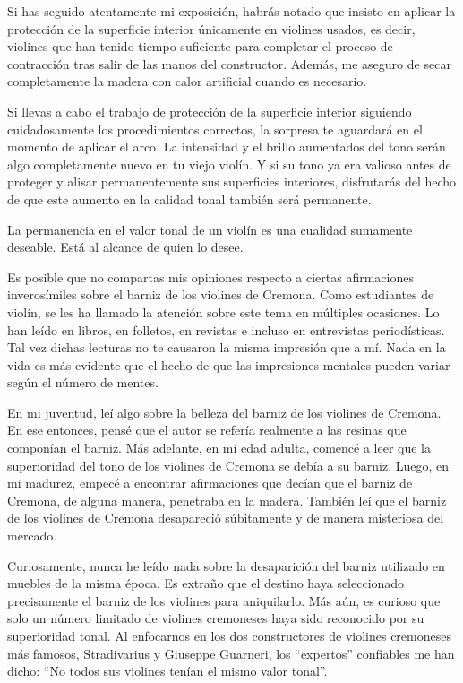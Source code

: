 \documentclass[12pt]{book}
\begin{document}
Si has seguido atentamente mi exposición, habrás notado que insisto en aplicar la protección de la superficie interior únicamente en violines usados, es decir, violines que han tenido tiempo suficiente para completar el proceso de contracción tras salir de las manos del constructor. Además, me aseguro de secar completamente la madera con calor artificial cuando es necesario.

Si llevas a cabo el trabajo de protección de la superficie interior siguiendo cuidadosamente los procedimientos correctos, la sorpresa te aguardará en el momento de aplicar el arco. La intensidad y el brillo aumentados del tono serán algo completamente nuevo en tu viejo violín. Y si su tono ya era valioso antes de proteger y alisar permanentemente sus superficies interiores, disfrutarás del hecho de que este aumento en la calidad tonal también será permanente.

La permanencia en el valor tonal de un violín es una cualidad sumamente deseable. Está al alcance de quien lo desee.

Es posible que no compartas mis opiniones respecto a ciertas afirmaciones inverosímiles sobre el barniz de los violines de Cremona. Como estudiantes de violín, se les ha llamado la atención sobre este tema en múltiples ocasiones. Lo han leído en libros, en folletos, en revistas e incluso en entrevistas periodísticas. Tal vez dichas lecturas no te causaron la misma impresión que a mí. Nada en la vida es más evidente que el hecho de que las impresiones mentales pueden variar según el número de mentes. 

En mi juventud, leí algo sobre la belleza del barniz de los violines de Cremona. En ese entonces, pensé que el autor se refería realmente a las resinas que componían el barniz. Más adelante, en mi edad adulta, comencé a leer que la superioridad del tono de los violines de Cremona se debía a su barniz. Luego, en mi madurez, empecé a encontrar afirmaciones que decían que el barniz de Cremona, de alguna manera, penetraba en la madera. También leí que el barniz de los violines de Cremona desapareció súbitamente y de manera misteriosa del mercado. 

Curiosamente, nunca he leído nada sobre la desaparición del barniz utilizado en muebles de la misma época. Es extraño que el destino haya seleccionado precisamente el barniz de los violines para aniquilarlo. Más aún, es curioso que solo un número limitado de violines cremoneses haya sido reconocido por su superioridad tonal. Al enfocarnos en los dos constructores de violines cremoneses más famosos, Stradivarius y Giuseppe Guarneri, los ``expertos'' confiables me han dicho: ``No todos sus violines tenían el mismo valor tonal''.
\end{document}
